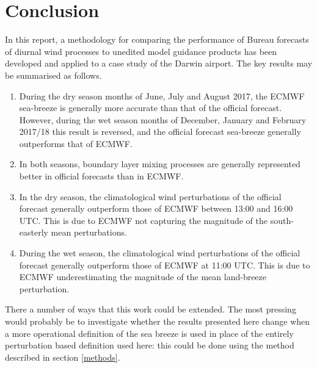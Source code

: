 \documentclass[alpha-refs]{wiley-article}
\begin{document}
\section{Conclusion}
\label{conclusion}
In this report, a methodology for comparing the performance of Bureau forecasts of diurnal wind processes to unedited model guidance products has been developed and applied to a case study of the Darwin airport. The key results may be summarised as follows.
\begin{enumerate}
\item
During the dry season months of June, July and August 2017, the ECMWF sea-breeze is generally more accurate than that of the official forecast. However, during the wet season months of December, January and February 2017/18 this result is reversed, and the official forecast sea-breeze generally outperforms that of ECMWF. 
\item
In both seasons, boundary layer mixing processes are generally represented better in official forecasts than in ECMWF.
\item
In the dry season, the climatological wind perturbations of the official forecast generally outperform those of ECMWF between 13:00 and 16:00 UTC. This is due to ECMWF not capturing the magnitude of the south-easterly mean perturbations. 
\item
During the wet season, the climatological wind perturbations of the official forecast generally outperform those of ECMWF at 11:00 UTC. This is due to ECMWF underestimating the magnitude of the mean land-breeze perturbation.
\end{enumerate}

There a number of ways that this work could be extended. The most pressing would probably be to investigate whether the results presented here change when a more operational definition of the sea breeze is used in place of the entirely perturbation based definition used here: this could be done using the method described in section \ref{methods}.


\end{document}
